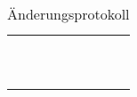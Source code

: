 
\begin{table}
    \centering
    \begin{tabular}{cccc}
         &  &  & \\
         &  &  & \\
         &  &  & \\
         &  &  & \\
         &  &  & \\
         &  &  & \\
         &  &  & \\
         &  &  & \\
         &  &  & \\
         &  &  & \\
    \end{tabular}
    \caption{Änderungsprotokoll}
    \label{tab:aenderungsprotokoll}
\end{table}